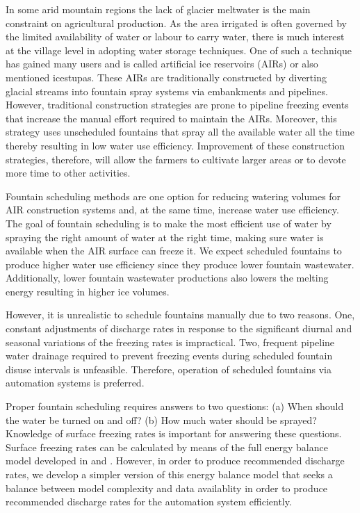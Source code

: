 \documentclass[tc, manuscript]{copernicus}
\begin{document}
\introduction

In some arid mountain regions the lack of glacier meltwater is the main constraint on agricultural production.
As the area irrigated is often governed by the limited availability of water or labour to carry water, there is
much interest at the village level in adopting water storage techniques. One of such a technique has gained many
users and is called artificial ice reservoirs (AIRs) or also mentioned icestupas. These AIRs are traditionally constructed by diverting glacial
streams into fountain spray systems via embankments and pipelines. However, traditional construction strategies
are prone to pipeline freezing events that increase the manual effort required to maintain the AIRs. Moreover,
this strategy uses unscheduled fountains that spray all the available water all the time thereby resulting in
low water use efficiency. Improvement of these construction strategies, therefore, will allow the farmers to
cultivate larger areas or to devote more time to other activities. 

Fountain scheduling methods are one option for reducing watering volumes for AIR construction systems and, at
the same time, increase water use efficiency. The goal of fountain scheduling is to make the most efficient use
of water by spraying the right amount of water at the right time, making sure water is available when the AIR
surface can freeze it. We expect scheduled fountains to produce higher water use efficiency since they produce
lower fountain wastewater. Additionally, lower fountain wastewater productions also lowers the melting energy
resulting in higher ice volumes.

However, it is unrealistic to schedule fountains manually due to two reasons. One, constant adjustments of
discharge rates in response to the significant diurnal and seasonal variations of the freezing rates is
impractical. Two, frequent pipeline water drainage required to prevent freezing events during scheduled fountain
disuse intervals is unfeasible. Therefore, operation of scheduled fountains via automation systems is preferred.

Proper fountain scheduling requires answers to two questions: (a) When should the water be turned on and off?
(b) How much water should be sprayed? Knowledge of surface freezing rates is important for answering these
questions. Surface freezing rates can be calculated by means of the full energy balance model developed in
\cite{balasubramanianInfluenceMeteorologicalConditions2022} and \cite{oerlemansBriefCommunicationGrowth2021}.
However, in order to produce recommended discharge rates, we develop a simpler version of this energy balance
model that seeks a balance between model complexity and data availablity in order to produce recommended
discharge rates for the automation system efficiently.
\end{document}
